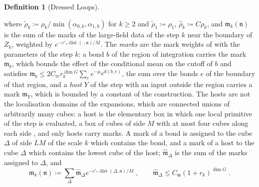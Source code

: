\documentclass[11pt]{preprint}
\newcommand{\dist}{\operatorname{dist}}
\numberwithin{equation}{section}
\theoremstyle{definition}
\newtheorem{definition}[theorem]{Definition}
\theoremstyle{remark}
\theoremstyle{plain}
\begin{document}
\begin{definition}[Dressed Loops]
\begin{enumerate}[label=(\roman*)]
where $\tilde\rho_k \coloneqq \rho_k/\min(\alpha_{0,k}, \alpha_{1,k})$ for $k \geq 2$ and $\tilde\rho_1 \coloneqq \rho_1$, $\hat\rho_k \coloneqq C\rho_k$, and $\mathfrak m_k(\mathfrak n)$ is the sum of the marks of the large-field data of the step $k$ near the boundary of $Z_k$, weighted by $e^{-c'_*\dist(\cdot, \mathfrak n)/M}$. The \emph{marks} are the mark weights of \cite[Lemma~9.24]{WilsonFirstStep} with the parameters of the step $k$: a bond $b$ of the region of integration carries the mark $\mathfrak m_b$, which bounds the effect of the conditional mean on the cutoff of $b$ and satisfies $\mathfrak m_b \leq 2C_\varpi r_k^{\dim G}\sum_ee^{-\mu_Hd(b,e)}$, the sum over the bonds $e$ of the boundary of that region, and a \emph{host} $Y$ of the step with an input outside the region carries a mark $\mathfrak m_Y$, which is bounded by a constant of the construction. The hosts are not the localisation domains of the expansions, which are connected unions of arbitrarily many cubes: a host is the elementary box in which one local primitive of the step is evaluated, a box of cubes of side $M$ with at most four cubes along each side \cite[(3.36), (3.75), Lemma~B.10]{WilsonFirstStep}, and only hosts carry marks. A mark of a bond is assigned to the cube $\Delta$ of side $LM$ of the scale $k$ which contains the bond, and a mark of a host to the cube $\Delta$ which contains the lowest cube of the host; $\hat{\mathfrak m}_\Delta$ is the sum of the marks assigned to $\Delta$, and
\begin{equation}\label{eq:marks}
    \mathfrak m_k(\mathfrak n) \coloneqq \sum_\Delta\hat{\mathfrak m}_\Delta e^{-c'_*\dist(\Delta, \mathfrak n)/M}\;,
    \qquad
    \hat{\mathfrak m}_\Delta \leq C_{\mathfrak m}(1 + r_k)^{\dim G}\;.
\end{equation}

\end{enumerate}
\end{definition}
\end{document}
